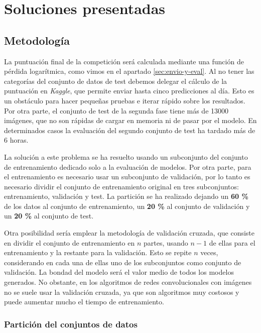 
\chapter{Soluciones presentadas} %
\label{cap:soluciones} %

\section{Metodología}
\label{sec:metodology}

La puntuación final de la competición será calculada mediante una función de
pérdida logarítmica, como vimos en el apartado \ref{sec:envio-y-eval}. Al no
tener las categorías del conjunto de datos de test debemos delegar el cálculo de
la puntuación en \textit{Kaggle}, que permite enviar hasta cinco predicciones al
día. Esto es un obstáculo para hacer pequeñas pruebas e iterar rápido sobre los
resultados. Por otra parte, el conjunto de test de la segunda fase tiene más de
13000 imágenes, que no son rápidas de cargar en memoria ni de pasar por el
modelo. En determinados casos la evaluación del segundo conjunto de test ha
tardado más de 6 horas.

La solución a este problema se ha resuelto usando un subconjunto del conjunto
de entrenamiento dedicado solo a la evaluación de modelos. Por otra parte, para
el entrenamiento es necesario usar un subconjunto de validación, por lo tanto
es necesario dividir el conjunto de entrenamiento original en tres
subconjuntos: entrenamiento, validación y test. La partición se ha realizado
dejando un \textbf{60 \%} de los datos al conjunto de entrenamiento, un
\textbf{20 \%} al conjunto de validación y un \textbf{20 \%} al conjunto de
test.

Otra posibilidad sería emplear la metodología de validación cruzada, que
consiste en dividir el conjunto de entrenamiento en $n$ partes, usando $n-1$ de
ellas para el entrenamiento y la restante para la validación. Esto se repite
$n$ veces, considerando en cada una de ellas uno de los subconjuntos como
conjunto de validación. La bondad del modelo será el valor medio de todos los
modelos generados. No obstante, en los algoritmos de redes convolucionales con
imágenes no se suele usar la validación cruzada, ya que son algoritmos muy
costosos y puede aumentar mucho el tiempo de entrenamiento.

\subsection{Partición del conjuntos de datos} 

